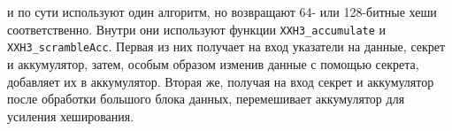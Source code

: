  и  по сути используют один алгоритм, но возвращают 64- или 128-битные хеши соответственно.
Внутри они используют функции \texttt{XXH3\_accumulate} и \texttt{XXH3\_scrambleAcc}.
Первая из них получает на вход указатели на данные, секрет и аккумулятор, затем, особым образом изменив данные с помощью секрета, добавляет их в аккумулятор.
Вторая же, получая на вход секрет и аккумулятор после обработки большого блока данных, перемешивает аккумулятор для усиления хеширования.
